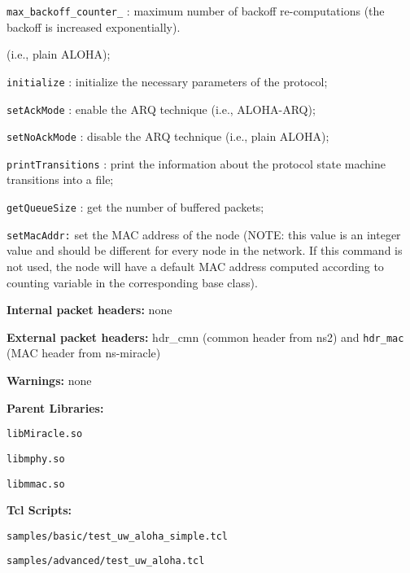 \begin{description}
\begin{description}
     \item {\tt max\_backoff\_counter\_} : maximum number of backoff re-computations (the backoff is increased exponentially).
    \end{description}(i.e., plain ALOHA);
     \item {\tt initialize} : initialize the necessary parameters of the protocol;
     \item {\tt setAckMode} : enable the ARQ technique (i.e., ALOHA-ARQ);
     \item {\tt setNoAckMode} : disable the ARQ technique (i.e., plain ALOHA); 
     \item {\tt printTransitions} : print the information about the protocol state machine transitions into a file;	
     \item {\tt getQueueSize} : get the number of buffered packets;
     \item {\tt setMacAddr:} set the MAC address of the node (NOTE: this value is an integer value and should be different for every node in the network. If this command is not used, the node will have a default MAC address computed according to counting variable in the corresponding base class). 
      \item {\bf Internal packet headers:} none
      \item {\bf External packet headers:} {hdr\_cmn} (common header from ns2) and {\tt hdr\_mac} (MAC header from ns-miracle)
      \item {\bf Warnings:} none
      \item {\bf Parent Libraries:} 
        \begin{description}
         \item {\tt libMiracle.so}
	      \item {\tt libmphy.so} 
	      \item {\tt libmmac.so}
        \end{description}
   \item {\bf Tcl Scripts:}
      \begin{description}
	    \item {\tt samples/basic/test\_uw\_aloha\_simple.tcl}
	    \item {\tt samples/advanced/test\_uw\_aloha.tcl}
      \end{description}
\end{description}

\vspace{1 cm}


